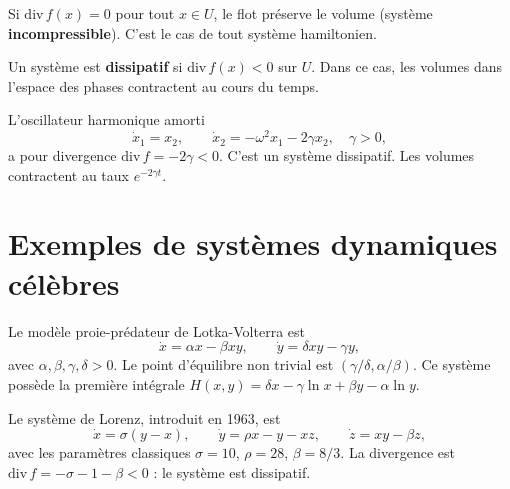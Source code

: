 \begin{corollaire}
Si $\mathrm{div}\, f(x) = 0$ pour tout $x \in U$, le flot pr\'eserve le volume
(syst\`eme \textbf{incompressible}). C'est le cas de tout syst\`eme hamiltonien.
\end{corollaire}

\begin{definition}
Un syst\`eme est \textbf{dissipatif} si $\mathrm{div}\, f(x) < 0$ sur $U$.
Dans ce cas, les volumes dans l'espace des phases contractent au cours du temps.
\end{definition}

\begin{exemple}
L'oscillateur harmonique amorti
\[
    \dot{x}_1 = x_2, \qquad \dot{x}_2 = -\omega^2 x_1 - 2\gamma x_2, \quad \gamma > 0,
\]
a pour divergence $\mathrm{div}\, f = -2\gamma < 0$. C'est un syst\`eme dissipatif.
Les volumes contractent au taux $e^{-2\gamma t}$.
\end{exemple}

\section{Exemples de syst\`emes dynamiques c\'el\`ebres}

\begin{exemple}
Le mod\`ele proie-pr\'edateur de Lotka-Volterra est
\[
    \dot{x} = \alpha x - \beta xy, \qquad \dot{y} = \delta xy - \gamma y,
\]
avec $\alpha, \beta, \gamma, \delta > 0$. Le point d'\'equilibre non trivial est
$(\gamma/\delta, \alpha/\beta)$. Ce syst\`eme poss\`ede la premi\`ere int\'egrale
$H(x,y) = \delta x - \gamma \ln x + \beta y - \alpha \ln y$.
\end{exemple}

\begin{exemple}
Le syst\`eme de Lorenz, introduit en 1963, est
\[
    \dot{x} = \sigma(y - x), \qquad
    \dot{y} = \rho x - y - xz, \qquad
    \dot{z} = xy - \beta z,
\]
avec les param\`etres classiques $\sigma = 10$, $\rho = 28$, $\beta = 8/3$.
La divergence est $\mathrm{div}\, f = -\sigma - 1 - \beta < 0$ :
le syst\`eme est dissipatif.
\end{exemple}

